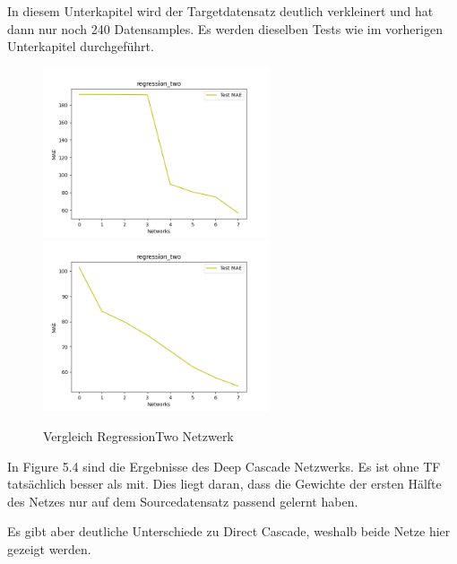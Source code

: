 In diesem Unterkapitel wird der Targetdatensatz deutlich verkleinert und hat dann nur noch 240 Datensamples. Es werden dieselben Tests wie 
im vorherigen Unterkapitel durchgeführt. 


\begin{figure}[htpb]
    \includegraphics[height=5cm]{../../Plots/ba_plots/regression_small/regr2_ts.png}
    \includegraphics[height=5cm]{../../Plots/ba_plots/regression_small/woregr2_ts.png}
    \caption{\label{fig:smallregr} Vergleich RegressionTwo Netzwerk}
\end{figure}


In Figure 5.4 sind die Ergebnisse des Deep Cascade Netzwerks. Es ist ohne TF tatsächlich besser als mit. Dies liegt daran, dass die Gewichte der 
ersten Hälfte des Netzes nur auf dem Sourcedatensatz passend gelernt haben. 

Es gibt aber deutliche Unterschiede zu Direct Cascade, weshalb beide Netze hier gezeigt werden. 

